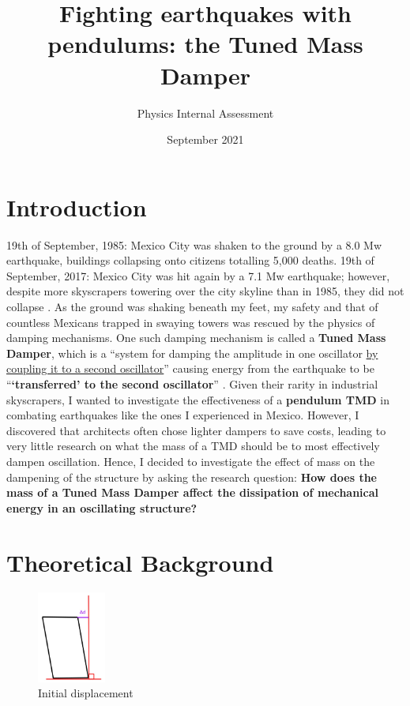 \documentclass{article}
\title{Fighting earthquakes with pendulums: the Tuned Mass Damper}
\author{Physics Internal Assessment
}
\date{September 2021}
\begin{document}
\maketitle
\tableofcontents
\clearpage
\section{Introduction}

19th of September, 1985: Mexico City was shaken to the ground by a 8.0 Mw earthquake, buildings collapsing onto citizens totalling 5,000 deaths. 19th of September, 2017: Mexico City was hit again by a 7.1 Mw earthquake; however, despite more skyscrapers towering over the city skyline than in 1985, they did not collapse \cite{source2}. As the ground was shaking beneath my feet, my safety and that of countless Mexicans trapped in swaying towers was rescued by the physics of damping mechanisms. One such damping mechanism is called a \textbf{Tuned Mass Damper}, which is a “system for damping the amplitude in one oscillator \underline{by coupling it to a second oscillator}” causing energy from the earthquake to be “\textbf{‘transferred’ to the second oscillator}” \cite{source1}. Given their rarity in industrial skyscrapers, I wanted to investigate the effectiveness of a \textbf{pendulum TMD} in combating earthquakes like the ones I experienced in Mexico. However, I discovered that architects often chose lighter dampers to save costs, leading to very little research on what the mass of a TMD should be to most effectively dampen oscillation. Hence, I decided to investigate the effect of mass on the dampening of the structure by asking the research question: \textbf{How does the mass of a Tuned Mass Damper affect the dissipation of mechanical energy in an oscillating structure?}

\section{Theoretical Background}

\begin{figure}
\centering
\includegraphics[width=0.2\textwidth]{img/fig1.jpg}
\caption{\label{fig:1}Initial displacement}
\vspace{-50pt}
\end{figure}
\end{document}
